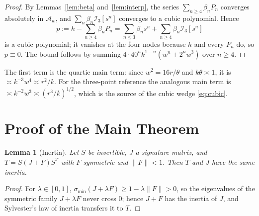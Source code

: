 \documentclass[11pt,a4paper]{article}
\numberwithin{equation}{section}
\newtheorem{lemma}[theorem]{Lemma}
\theoremstyle{definition}
\theoremstyle{remark}
\newcommand{\cA}{\mathcal A}
\newcommand{\cI}{\mathcal I}
\begin{document}
\begin{proof}
By Lemmas~\ref{lem:beta} and~\ref{lem:interp}, the series $\sum_{n\ge4}\beta_nP_n$ converges absolutely
in $\cA_w$, and $\sum_n\beta_n\cI_3[s^n]$ converges to a cubic polynomial. Hence
\[
p:=h-\sum_{n\ge4}\beta_nP_n=\sum_{n\le3}\beta_ns^n+\sum_{n\ge4}\beta_n\cI_3[s^n]
\]
is a cubic polynomial; it vanishes at the
four nodes because $h$ and every $P_n$ do, so $p\equiv0$. The bound follows by summing
$4\cdot40^nk^{1-n}(w^n+2^nw^3)$ over $n\ge4$.
\end{proof}

The first term is the quartic main term: since $w^2=16r/\theta$ and $k\theta\asymp1$, it is $\asymp k^{-3}w^4\asymp r^2/k$.
For the three-point reference the analogous main term is $\asymp k^{-2}w^3\asymp(r^3/k)^{1/2}$, which is the source of the
cubic wedge \eqref{eq:cubic}.

\section{Proof of the Main Theorem}\label{sec:proof}

\begin{lemma}[Inertia]\label{lem:inertia}
Let $S$ be invertible, $J$ a signature matrix, and $T=S(J+F)S^T$ with $F$ symmetric and $\|F\|<1$. Then $T$ and $J$ have
the same inertia.
\end{lemma}

\begin{proof}
For $\lambda\in[0,1]$, $\sigma_{\min}(J+\lambda F)\ge1-\lambda\|F\|>0$, so the eigenvalues of the symmetric family
$J+\lambda F$ never cross $0$; hence $J+F$ has the inertia of $J$, and Sylvester's law of inertia transfers it to $T$.
\end{proof}
\end{document}
